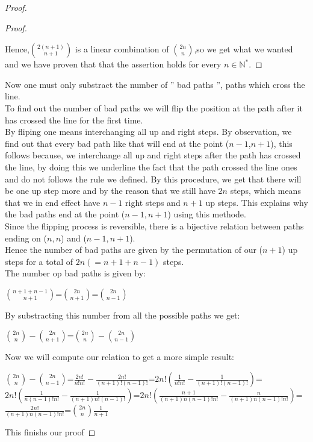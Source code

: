 \documentclass[a4paper,12pt,oneside]{article}
\begin{document}
\begin{proof}
\begin{proof}
\begin{center}
\end{center}
\vspace{0.3cm}
Hence,$\binom{2(n+1)}{n+1}$ is a linear combination of $\binom{2n}{n}$,so we get what we wanted and we have proven that that the assertion holds for every $n\in\mathbb{N^*}$.
\end{proof}
Now one must only substract the number of  '' bad paths '', paths which cross the line.
\\
To find out the number of bad paths we will flip the position at the path after it has crossed the line for the first time.
\\
By fliping one means interchanging all up and right steps.
\newpage
By observation, we find out that every bad path like that will end at the point ($n-1$,$n+1$), this follows because, we interchange all up and right steps after the path has crossed the line, by doing this we underline the fact that the path crossed the line ones and do not follows the rule we defined. By this procedure, we get that there will be one up step more and by the reason that we still have $2n$ steps, which means that we in end effect have $n-1$ right steps and $n+1$ up steps. This explains why the bad paths end at the point ($n-1,n+1$) using this methode.
\vspace{0,3cm}
\\Since the flipping process is reversible, there is a bijective relation between paths ending on ($n,n$) and ($n-1,n+1$).
\vspace{0,3cm}
\\Hence the number of bad paths are given by the permutation of our ($n+1$) up steps for a total of $2n(=n+1+n-1)$ steps.
\vspace{0,3cm}
\\The number op bad paths is given by:
\begin{center}
$\binom{n+1+n-1}{n+1}$=$\binom{2n}{n+1}$=$\binom{2n}{n-1}$
\end{center}
By substracting this number from all the possible paths we get:
\begin{center}
$\binom{2n}{n}-\binom{2n}{n+1}$=$\binom{2n}{n}-\binom{2n}{n-1}$ 
\end{center}
Now we will compute our relation to get a more simple result:
\begin{center}
$\binom{2n}{n}-\binom{2n}{n-1}$=$\frac{2n!}{n!n!}-\frac{2n!}{(n+1)!(n-1)!}$=$2n!(\frac{1}{n!n!}-\frac{1}{(n+1)!(n-1)!})$=$2n!(\frac{1}{n(n-1)!n!}-\frac{1}{(n+1)n!(n-1)!})$=$2n!(\frac{n+1}{(n+1)n(n-1)!n!}-\frac{n}{(n+1)n(n-1)!n!})$=$\frac{2n!}{(n+1)n(n-1)!n!}$=$\binom{2n}{n}\frac{1}{n+1}$
\end{center}
\vspace{0.2cm}
This finishs our proof
\end{proof}
\end{document}
